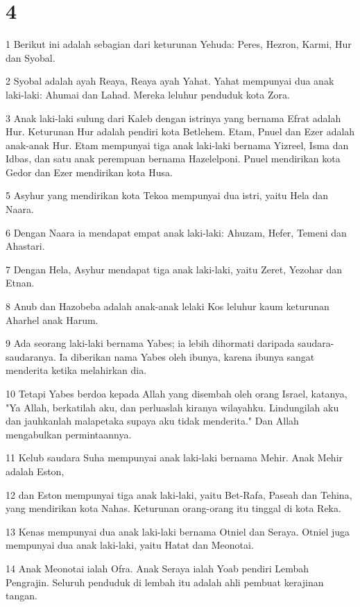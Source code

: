 \chapter{4}

\par 1 Berikut ini adalah sebagian dari keturunan Yehuda: Peres, Hezron, Karmi, Hur dan Syobal.
\par 2 Syobal adalah ayah Reaya, Reaya ayah Yahat. Yahat mempunyai dua anak laki-laki: Ahumai dan Lahad. Mereka leluhur penduduk kota Zora.
\par 3 Anak laki-laki sulung dari Kaleb dengan istrinya yang bernama Efrat adalah Hur. Keturunan Hur adalah pendiri kota Betlehem. Etam, Pnuel dan Ezer adalah anak-anak Hur. Etam mempunyai tiga anak laki-laki bernama Yizreel, Isma dan Idbas, dan satu anak perempuan bernama Hazelelponi. Pnuel mendirikan kota Gedor dan Ezer mendirikan kota Husa.
\par 5 Asyhur yang mendirikan kota Tekoa mempunyai dua istri, yaitu Hela dan Naara.
\par 6 Dengan Naara ia mendapat empat anak laki-laki: Ahuzam, Hefer, Temeni dan Ahastari.
\par 7 Dengan Hela, Asyhur mendapat tiga anak laki-laki, yaitu Zeret, Yezohar dan Etnan.
\par 8 Anub dan Hazobeba adalah anak-anak lelaki Kos leluhur kaum keturunan Aharhel anak Harum.
\par 9 Ada seorang laki-laki bernama Yabes; ia lebih dihormati daripada saudara-saudaranya. Ia diberikan nama Yabes oleh ibunya, karena ibunya sangat menderita ketika melahirkan dia.
\par 10 Tetapi Yabes berdoa kepada Allah yang disembah oleh orang Israel, katanya, "Ya Allah, berkatilah aku, dan perluaslah kiranya wilayahku. Lindungilah aku dan jauhkanlah malapetaka supaya aku tidak menderita." Dan Allah mengabulkan permintaannya.
\par 11 Kelub saudara Suha mempunyai anak laki-laki bernama Mehir. Anak Mehir adalah Eston,
\par 12 dan Eston mempunyai tiga anak laki-laki, yaitu Bet-Rafa, Paseah dan Tehina, yang mendirikan kota Nahas. Keturunan orang-orang itu tinggal di kota Reka.
\par 13 Kenas mempunyai dua anak laki-laki bernama Otniel dan Seraya. Otniel juga mempunyai dua anak laki-laki, yaitu Hatat dan Meonotai.
\par 14 Anak Meonotai ialah Ofra. Anak Seraya ialah Yoab pendiri Lembah Pengrajin. Seluruh penduduk di lembah itu adalah ahli pembuat kerajinan tangan.
